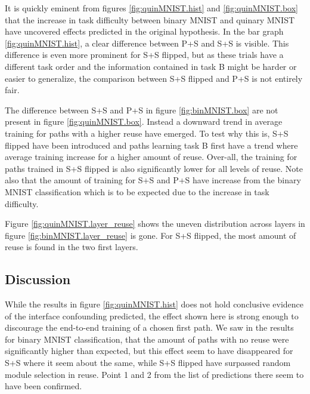 It is quickly eminent from figures \ref{fig:quinMNIST.hist} and \ref{fig:quinMNIST.box} that the increase in task difficulty between binary MNIST and quinary MNIST have uncovered effects predicted in the original hypothesis. In the bar graph \ref{fig:quinMNIST.hist}, a clear difference between P+S and S+S is visible. This difference is even more prominent for S+S flipped, but as these trials have a different task order and the information contained in task B might be harder or easier to generalize, the comparison between S+S flipped and P+S is not entirely fair. 

The difference between S+S and P+S in figure \ref{fig:binMNIST.box} are not present in figure \ref{fig:quinMNIST.box}. Instead a downward trend in average training for paths with a higher reuse have emerged. To test why this is, S+S flipped have been introduced and paths learning task B first have a trend where average training increase for a higher amount of reuse. Over-all, the training for paths trained in S+S flipped is also significantly lower for all levels of reuse. Note also that the amount of training for S+S and P+S have increase from the binary MNIST classification which is to be expected due to the increase in task difficulty. 

Figure \ref{fig:quinMNIST.layer_reuse} shows the uneven distribution across layers in figure \ref{fig:binMNIST.layer_reuse} is gone. For S+S flipped, the most amount of reuse is found in the two first layers.

\subsection{Discussion}
While the results in figure \ref{fig:quinMNIST.hist} does not hold conclusive evidence of the interface confounding predicted, the effect shown here is strong enough to discourage the end-to-end training of a chosen first path. We saw in the results for binary MNIST classification, that the amount of paths with no reuse were significantly higher than expected, but this effect seem to have disappeared for S+S where it seem about the same, while S+S flipped have surpassed random module selection in reuse. Point 1 and 2 from the list of predictions there seem to have been confirmed. 

